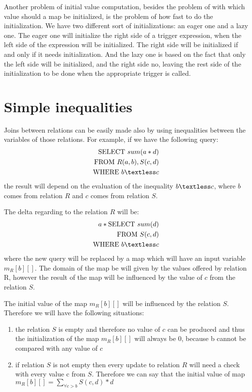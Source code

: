 \documentclass[12pt]{article}
\begin{document}
Another problem of initial value computation, besides the problem of with which value should a map be initialized, is the problem of how fast to do the initialization. We have two different sort of initializations: an eager one and a lazy one. The eager one will initialize the right side of a trigger expression, when the left side of the expression will be initialized. The right side will be initialized if and only if it needs initialization. And the lazy one is based on the fact that only the left side will be initialized, and the right side no, leaving the rest side of the initialization to be done when the appropriate trigger is called.

\section{Simple inequalities}

Joins between relations can be easily made also by using inequalities between the variables of those relations. For example, if we have the following query:
\begin{align*}
\mbox{SELECT }sum(a*d)\\
\mbox{FROM } R(a,b),S(c,d)\\
\mbox{WHERE } b\textless c 
\end{align*}
the result will depend on the evaluation of the inequality $b\textless c$, where $b$ comes from relation $R$ and $c$ comes from relation $S$.

The delta regarding to the relation $R$ will be: 
\begin{align*}
a*\mbox{SELECT }sum(d)\\
\mbox{FROM }S(c,d)\\
\mbox{WHERE } b\textless c 
\end{align*}
where the new query will be replaced by a map which will have an input variable $m_R[b][]$. The domain of the map be will given by the values offered by relation R, however the result of the map will be influenced by the value of $c$ from the relation $S$.

The initial value of the map $m_R[b][]$ will be influenced by the relation $S$. Therefore we will have the following situations:
\begin{enumerate}
\item the relation $S$ is empty and therefore no value of $c$ can be produced and thus the initialization of the map $m_R[b][]$ will always be 0, because b cannot be compared with any value of $c$
\item if relation $S$ is not empty then every update to relation $R$ will need a check with every value c from $S$. Therefore we can say that the initial value of map $m_R[b][]=\sum_{\forall c>b} S(c,d)*d$
\end{enumerate}
\end{document}
